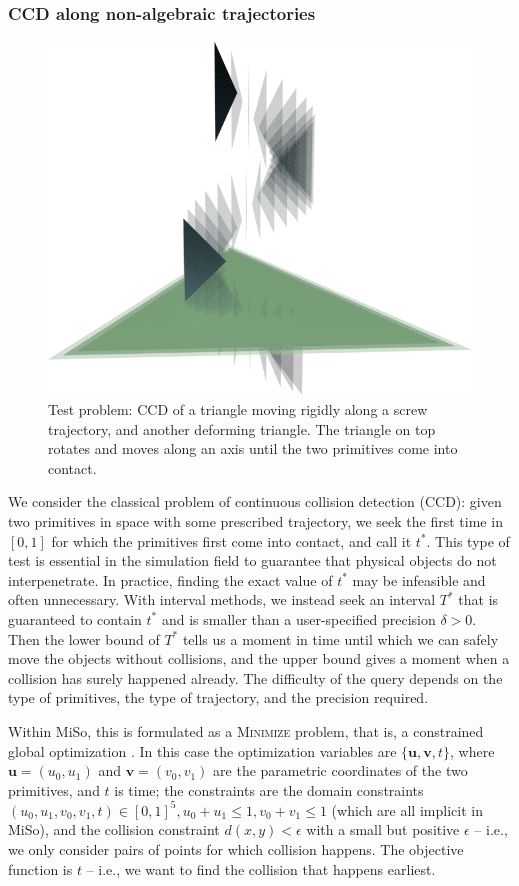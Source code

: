 \subsubsection{CCD along non-algebraic trajectories}
\begin{figure}
	\centering
	\includegraphics[width=0.8\linewidth]{fig/spiral.png}
	\caption{Test problem: CCD of a triangle moving rigidly along a screw trajectory, and another deforming triangle. The triangle on top rotates and moves along an axis until the two primitives come into contact.}
	\label{fig:tori}
\end{figure}
We consider the classical problem of continuous collision detection (CCD): given two primitives in space with some prescribed trajectory, we seek the first time in $[0,1]$ for which the primitives first come into contact, and call it $t^*$.
This type of test is essential in the simulation field to guarantee that physical objects do not interpenetrate.
In practice, finding the exact value of $t^*$ may be infeasible and often unnecessary. With interval methods, we instead seek an interval $T^*$ that is guaranteed to contain $t^*$ and is smaller than a user-specified precision $\delta>0$.
Then the lower bound of $T^*$ tells us a moment in time until which we can safely move the objects without collisions, and the upper bound gives a moment when a collision has surely happened already.
The difficulty of the query depends on the type of primitives, the type of trajectory, and the precision required.

Within MiSo, this is formulated as a \textsc{Minimize} problem, that is, a constrained global optimization \cite{Sichetti2025}.
In this case the optimization variables are $\{\mathbf{u}, \mathbf{v}, t\}$, where $\mathbf{u}=(u_0, u_1)$ and $\mathbf{v}=(v_0, v_1)$ are the parametric coordinates of the two primitives, and $t$ is time;
the constraints are the domain constraints $(u_0,u_1,v_0,v_1,t)\in[0,1]^5, u_0+u_1\leq1, v_0+v_1\leq1$ (which are all implicit in MiSo), and the collision constraint $d(x,y)<\epsilon$ with a small but positive $\epsilon$ -- i.e., we only consider pairs of points for which collision happens.
The objective function is $t$ -- i.e., we want to find the collision that happens earliest.

